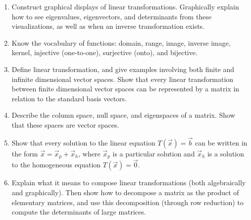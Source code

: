 
\begin{enumerate}

\item Construct graphical displays of linear transformations.  Graphically explain how to see eigenvalues, eigenvectors, and determinants from these visualizations, as well as when an inverse transformation exists.
\item Know the vocabulary of functions: domain, range, image, inverse image, kernel, injective (one-to-one), surjective (onto), and bijective. 
\item Define linear transformation, and give examples involving both finite and infinite dimensional vector spaces. 
Show that every linear transformation between finite dimensional vector spaces can be represented by a matrix in relation to the standard basis vectors.
\item Describe the column space, null space, and eigenspaces of a matrix. Show that these spaces are vector spaces. 
\item Show that every solution to the linear equation $T(\vec x)=\vec b$ can be written in the form $\vec x = \vec x_p+\vec x_h$, where $\vec x_p$ is a particular solution and $\vec x_h$ is a solution to the homogeneous equation $T(\vec x)=\vec 0$.
\item Explain what it means to compose linear transformations (both algebraically and graphically). Then show how to decompose a matrix as the product of elementary matrices, and use this decomposition (through row reduction) to compute the determinants of large matrices. 


\end{enumerate}

